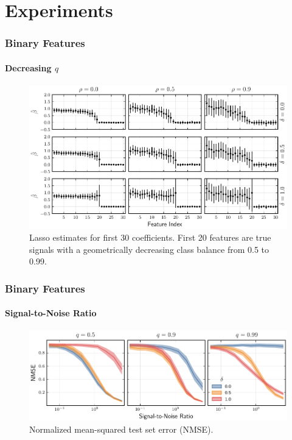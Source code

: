 \documentclass[10pt]{beamer}
\begin{document}
\section{Experiments}

\begin{frame}[c]
  \frametitle{Binary Features}
  \framesubtitle{Decreasing \(q\)}

  \begin{figure}[htpb]
    \centering
    \includegraphics[width=\textwidth]{figures/binary_decreasing.pdf}
    \caption{%
      Lasso estimates for first 30 coefficients. First 20 features are true signals with a geometrically decreasing class balance from 0.5 to 0.99.
    }
  \end{figure}
\end{frame}

\begin{frame}[c]
  \frametitle{Binary Features}
  \framesubtitle{Signal-to-Noise Ratio}

  \begin{figure}[htpb]
    \centering
    \includegraphics[width=\textwidth]{figures/binary_data_sim.pdf}
    \caption{%
      Normalized mean-squared test set error (NMSE).
    }
  \end{figure}
\end{frame}
\end{document}
